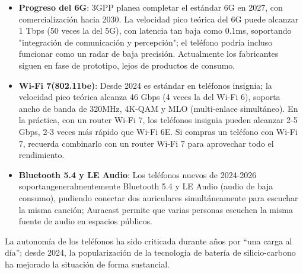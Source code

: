 \begin{itemize}
  \item \textbf{Progreso del 6G}: 3GPP planea completar el estándar 6G en 2027, con comercialización hacia 2030. La velocidad pico teórica del 6G puede alcanzar 1 Tbps (50 veces la del 5G), con latencia tan baja como 0.1ms, soportando "integración de comunicación y percepción"; el teléfono podría incluso funcionar como un radar de baja precisión. Actualmente los fabricantes siguen en fase de prototipo, lejos de productos de consumo.
  \item \textbf{Wi-Fi 7(802.11be)}: Desde 2024 es estándar en teléfonos insignia; la velocidad pico teórica alcanza 46 Gbps (4 veces la del Wi-Fi 6), soporta ancho de banda de 320MHz, 4K-QAM y MLO (multi-enlace simultáneo). En la práctica, con un router Wi-Fi 7, los teléfonos insignia pueden alcanzar 2-5 Gbps, 2-3 veces más rápido que Wi-Fi 6E. Si compras un teléfono con Wi-Fi 7, recuerda combinarlo con un router Wi-Fi 7 para aprovechar todo el rendimiento.
  \item \textbf{Bluetooth 5.4 y LE Audio}: Los teléfonos nuevos de 2024-2026 soportangeneralmentemente Bluetooth 5.4 y LE Audio (audio de baja consumo), pudiendo conectar dos auriculares simultáneamente para escuchar la misma canción; Auracast permite que varias personas escuchen la misma fuente de audio en espacios públicos.
\end{itemize}


La autonomía de los teléfonos ha sido criticada durante años por “una carga al día”; desde 2024, la popularización de la tecnología de batería de silicio-carbono ha mejorado la situación de forma sustancial.

